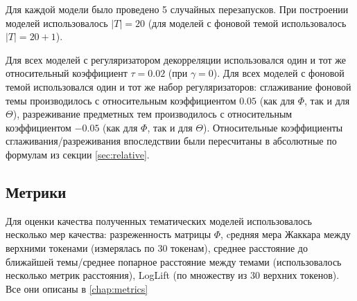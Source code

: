 Для каждой модели было проведено 5 случайных перезапусков. При построении моделей использовалось $|T|= 20$ (для моделей с фоновой темой использовалось $|T|= 20+1$).  

Для всех моделей с регуляризатором декорреляции использовался один и тот же относительный коэффициент $\tau = 0.02$ (при $\gamma=0$). Для всех моделей с фоновой темой использовался один и тот же набор регуляризаторов: сглаживание фоновой темы производилось с относительным коэффициентом $0.05$ (как для $\Phi$, так и для $\Theta$), разреживание предметных тем производилось  с относительным коэффициентом $-0.05$ (как для $\Phi$, так и для $\Theta$). Относительные коэффициенты сглаживания/разреживания впоследствии были пересчитаны в абсолютные по формулам из секции \ref{sec:relative}.  

\subsection{Метрики} 

Для оценки качества полученных тематических моделей использовалось несколько мер качества: разреженность матрицы $\Phi$, cредняя мера Жаккара между верхними токенами (измерялась по 30 токенам), среднее расстояние до ближайшей темы/среднее попарное расстояние между темами (использовалось несколько метрик расстояния), LogLift (по множеству из 30 верхних токенов). Все они описаны в \ref{chap:metrics} 

